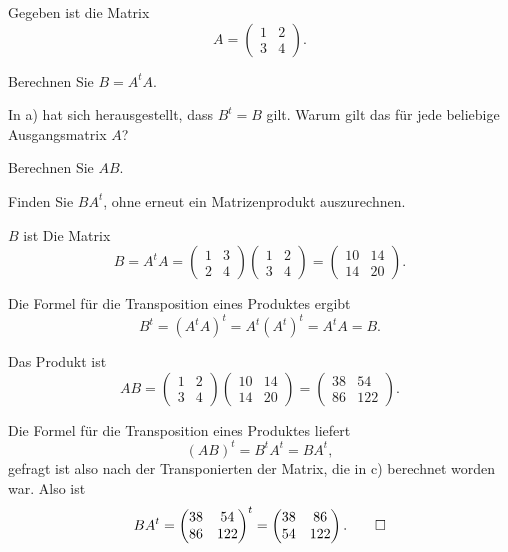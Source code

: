 Gegeben ist die Matrix
\[
A
=
\begin{pmatrix}1&2\\3&4\end{pmatrix}.
\]
\begin{teilaufgaben}
\item Berechnen Sie $B=A^tA$.
\item In a) hat sich herausgestellt, dass $B^t=B$ gilt.
Warum gilt das für jede beliebige Ausgangsmatrix $A$?
\item
Berechnen Sie $AB$.
\item
Finden Sie $BA^t$, ohne erneut ein Matrizenprodukt auszurechnen.
\end{teilaufgaben}


\begin{loesung}
\begin{teilaufgaben}
\item $B$ ist Die Matrix
\[
B=A^tA=
\begin{pmatrix}1&3\\2&4\end{pmatrix}
\begin{pmatrix}1&2\\3&4\end{pmatrix}
=
\begin{pmatrix}
10&14\\
14&20
\end{pmatrix}.
\]
\item Die Formel für die Transposition eines Produktes ergibt
\[
B^t
=
(A^tA)^t
=
A^t(A^t)^t
=
A^tA
=
B.
\]
\item
Das Produkt ist
\[
AB
=
\begin{pmatrix}1&2\\3&4\end{pmatrix}
\begin{pmatrix}
10&14\\
14&20
\end{pmatrix}
=
\begin{pmatrix}
38& 54\\
86&122
\end{pmatrix}.
\]
\item
Die Formel für die Transposition eines Produktes liefert
\[
(AB)^t = B^tA^t=BA^t,
\]
gefragt ist also nach der Transponierten der Matrix, die in c) berechnet
worden war.
Also ist
\[
BA^t
= 
\begin{pmatrix}
38& 54\\
86&122
\end{pmatrix}^t
=
\begin{pmatrix}
38& 86\\
54&122
\end{pmatrix}.
\qedhere
\]
\end{teilaufgaben}
\end{loesung}



